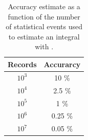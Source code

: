 \begin{table}
  \begin{center}
  {\let\my=\\
    \begin{tabular}{|c|c|}
    \hline
    Records       & Accurarcy \\
    \hline
    $10^3$ & 10 \% \\
    $10^4$ & 2.5 \% \\
    $10^5$ & 1 \% \\
    $10^6$ & 0.25 \% \\
    $10^7$ & 0.05 \% \\
    \hline
    \end{tabular}
    \caption{Accuracy estimate as a function of the number of statistical events used to estimate an integral with \MCS.}
    \label{t:mc_accuracy}
  }
  \end{center}
\end{table}

